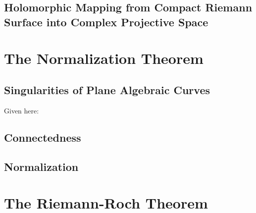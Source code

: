 \documentclass[Total.tex]{subfiles}
\begin{document}
		\section{Holomorphic Mapping from Compact Riemann Surface into Complex Projective Space}
	
	\chapter{The Normalization Theorem}
	
		\section{Singularities of Plane Algebraic Curves}
		
			Given here: 
		
		\section{Connectedness}
		
		\section{Normalization}
	
	\chapter{The Riemann-Roch Theorem}
\end{document}
